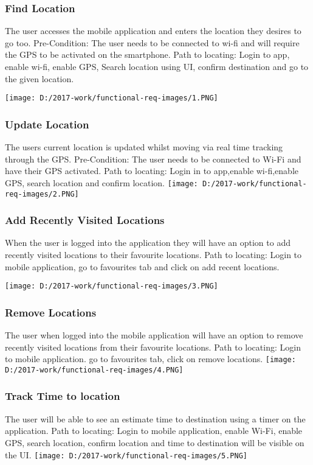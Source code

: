 \documentclass{article}
\begin{document}
\subsubsection{Find Location}
The user accesses the mobile application and enters the location they desires to go too. Pre-Condition: The user needs to be connected to wi-fi and will require the GPS to be activated on the smartphone. Path to locating: Login to app, enable wi-fi, enable GPS, Search location using UI, confirm destination and go to the given location.
\begin{center}
\texttt{[image: D:/2017-work/functional-req-images/1.PNG]}
\newpage
\subsubsection{Update Location}
The users current location is updated whilst moving via real time tracking through the GPS. Pre-Condition: The user needs to be connected to Wi-Fi and have their GPS activated. Path to locating: Login in to app,enable wi-fi,enable GPS, search location and confirm location.
\texttt{[image: D:/2017-work/functional-req-images/2.PNG]}
\newpage

\subsubsection{Add Recently Visited Locations}
When the user is logged into the application they will have an option to add recently visited locations to their favourite locations. Path to locating: Login to mobile application, go to favourites tab and click on add recent locations.


\texttt{[image: D:/2017-work/functional-req-images/3.PNG]}
\newpage
\subsubsection{Remove Locations}
The user when logged into the mobile application will have an option to remove recently visited locations from their favourite locations. Path to locating: Login to mobile application. go to favourites tab, click on remove locations.
\texttt{[image: D:/2017-work/functional-req-images/4.PNG]}
\newpage
\subsubsection{Track Time to location}
The user will be able to see an estimate time to destination using a timer on the application. Path to locating: Login to mobile application, enable Wi-Fi, enable GPS, search location, confirm location and time to destination will be visible on the UI. 
\texttt{[image: D:/2017-work/functional-req-images/5.PNG]}
\newpage


\end{center}
\end{document}
